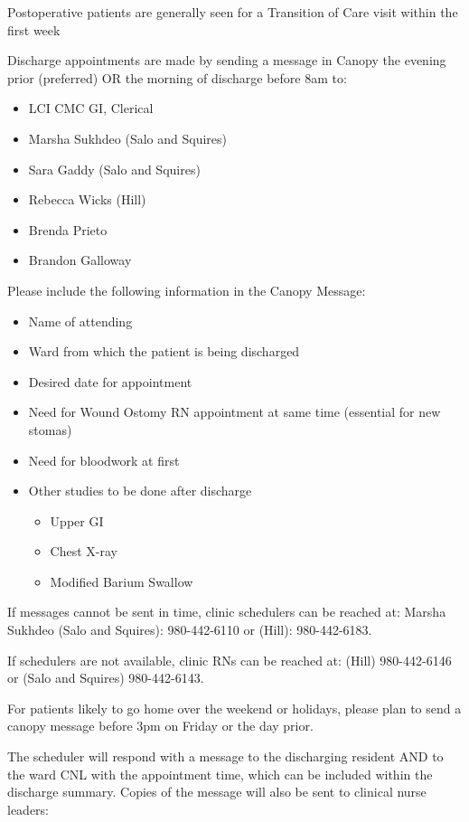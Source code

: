 \documentclass[
]{book}
\providecommand{\tightlist}{%
  \setlength{\itemsep}{0pt}\setlength{\parskip}{0pt}}
\begin{document}
Postoperative patients are generally seen for a Transition of Care visit within the first week

Discharge appointments are made by sending a message in Canopy the evening prior (preferred) OR the morning of discharge before 8am to:

\begin{itemize}
\tightlist
\item
  LCI CMC GI, Clerical
\item
  Marsha Sukhdeo (Salo and Squires)
\item
  Sara Gaddy (Salo and Squires)
\item
  Rebecca Wicks (Hill)
\item
  Brenda Prieto
\item
  Brandon Galloway
\end{itemize}

Please include the following information in the Canopy Message:

\begin{itemize}
\tightlist
\item
  Name of attending
\item
  Ward from which the patient is being discharged
\item
  Desired date for appointment
\item
  Need for Wound Ostomy RN appointment at same time (essential for new stomas)
\item
  Need for bloodwork at first
\item
  Other studies to be done after discharge

  \begin{itemize}
  \tightlist
  \item
    Upper GI
  \item
    Chest X-ray
  \item
    Modified Barium Swallow
  \end{itemize}
\end{itemize}

If messages cannot be sent in time, clinic schedulers can be reached at: Marsha Sukhdeo (Salo and Squires): 980-442-6110 or (Hill): 980-442-6183.

If schedulers are not available, clinic RNs can be reached at: (Hill) 980-442-6146 or (Salo and Squires) 980-442-6143.

For patients likely to go home over the weekend or holidays, please plan to send a canopy message before 3pm on Friday or the day prior.

The scheduler will respond with a message to the discharging resident AND to the ward CNL with the appointment time, which can be included within the discharge summary. Copies of the message will also be sent to clinical nurse leaders:
\end{document}
